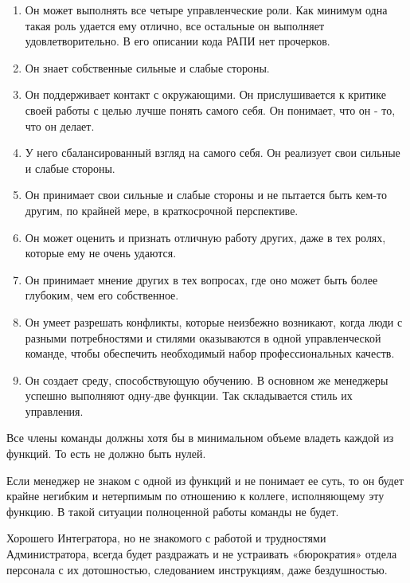\documentclass{../industrial-development}
\begin{document}
\begin{enumerate} 
\item Он может выполнять все четыре управленческие роли. Как минимум одна такая роль удается ему отлично, все остальные он выполняет удовлетворительно. В его описании кода РАПИ нет прочерков. 

\item Он знает собственные сильные и слабые стороны. 

\item Он поддерживает контакт с окружающими. Он прислушивается к критике своей работы с целью лучше понять самого себя. Он понимает, что он - то, что он делает. 

\item У него сбалансированный взгляд на самого себя. Он реализует свои сильные и слабые стороны. 

\item Он принимает свои сильные и слабые стороны и не пытается быть кем-то другим, по крайней мере, в краткосрочной перспективе. 

\item Он может оценить и признать отличную работу других, даже в тех ролях, которые ему не очень удаются. 

\item Он принимает мнение других в тех вопросах, где оно может быть более глубоким, чем его собственное. 

\item Он умеет разрешать конфликты, которые неизбежно возникают, когда люди с разными потребностями и стилями оказываются в одной управленческой команде, чтобы обеспечить необходимый набор профессиональных качеств. 

\item Он создает среду, способствующую обучению. 
В основном же менеджеры успешно выполняют одну-две функции. Так складывается стиль их управления. 
\end{enumerate}

Все члены команды должны хотя бы в минимальном объеме владеть каждой из функций. То есть не должно быть нулей.

Если менеджер не знаком с одной из функций и не понимает ее суть, то он будет крайне негибким и нетерпимым по отношению к коллеге, исполняющему эту функцию. В такой ситуации полноценной работы команды не будет.

Хорошего Интегратора, но не знакомого с работой и трудностями Администратора, всегда будет раздражать и не устраивать «бюрократия» отдела персонала с их дотошностью, следованием инструкциям, даже бездушностью.
\end{document}

